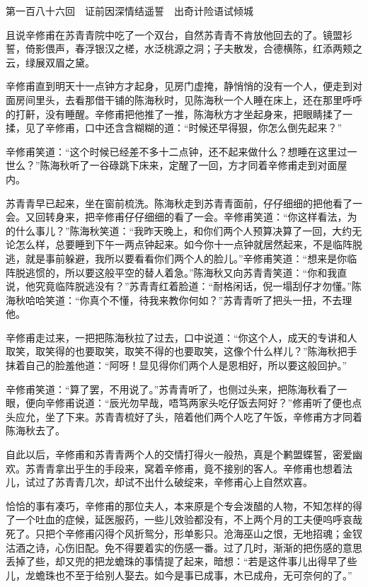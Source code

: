 \documentclass[12pt,UTF8]{ctexbook}
\begin{document}
{{{第一百八十六回　证前因深情结遥誓　出奇计险语试倾城





且说辛修甫在苏青青院中吃了一个双台，自然苏青青不肯放他回去的了。镜盟衫誓，倚影偎声，春浮银汉之槎，水泛桃源之洞；子夫散发，合德横陈，红添两颊之云，绿展双眉之黛。

辛修甫直到明天十一点钟方才起身，见房门虚掩，静悄悄的没有一个人，便走到对面房间里头，去看那借干铺的陈海秋时，见陈海秋一个人睡在床上，还在那里呼呼的打鼾，没有睡醒。辛修甫把他推了一推，陈海秋方才坐起身来，把眼睛揉了一揉，见了辛修甫，口中还含含糊糊的道：“时候还早得狠，你怎么倒先起来？”

辛修甫笑道：“这个时候已经差不多十二点钟，还不起来做什么？想睡在这里过一世么？”陈海秋听了一谷碌跳下床来，定醒了一回，方才同着辛修甫走到对面屋内。

苏青青早已起来，坐在窗前梳洗。陈海秋走到苏青青面前，仔仔细细的把他看了一会。又回转身来，把辛修甫仔仔细细的看了一会。辛修甫笑道：“你这样看法，为的什么事儿？”陈海秋笑道：“我昨天晚上，和你们两个人预算决算了一回，大约无论怎么样，总要睡到下午一两点钟起来。如今你十一点钟就居然起来，不是临阵脱逃，就是事前躲避，我所以要看看你们两个人的脸儿。”辛修甫笑道：“想来是你临阵脱逃惯的，所以要这般平空的替人着急。”陈海秋又向苏青青笑道：“你和我直说，他究竟临阵脱逃没有？”苏青青红着脸道：“耐格闲话，倪一塌刮仔才勿懂。”陈海秋哈哈笑道：“你真个不懂，待我来教你何如？”苏青青听了把头一扭，不去理他。

辛修甫走过来，一把把陈海秋拉了过去，口中说道：“你这个人，成天的专讲和人取笑，取笑得的也要取笑，取笑不得的也要取笑，这像个什么样儿？”陈海秋把手抹着自己的脸羞他道：“阿呀！显见得你们两个人是恩相好，所以要这般回护。”

辛修甫笑道：“算了罢，不用说了。”苏青青听了，也侧过头来，把陈海秋看了一眼，便向辛修甫说道：“辰光勿早哉，唔笃两家头吃仔饭去阿好？”修甫听了便也点头应允，坐了下来。苏青青梳好了头，陪着他们两个人吃了午饭，辛修甫方才同着陈海秋去了。

自此以后，辛修甫和苏青青两个人的交情打得火一般热，真是个鹣盟蝶誓，密爱幽欢。苏青青拿出乎生的手段来，窝着辛修甫，竟不接别的客人。辛修甫也想着法儿，试过了苏青青几次，却试不出什么破绽来，辛修甫心上自然欢喜。

恰恰的事有凑巧，辛修甫的那位夫人，本来原是个专会泼醋的人物，不知怎样的得了一个吐血的症候，延医服药，一些儿效验都没有，不上两个月的工夫便呜呼哀哉死了。只把个辛修甫闪得个风折鸳分，形单影只。沧海巫山之恨，无地招魂；金钗沽酒之诗，心伤旧配。免不得要着实的伤感一番。过了几时，渐渐的把伤感的意思丢掉了些，却又兜的把龙蟾珠的事情提了起来，暗想：“若是这件事儿出得早了些儿，龙蟾珠也不至于给别人娶去。如今是事已成事，木已成舟，无可奈何的了。”

}}}
\end{document}
